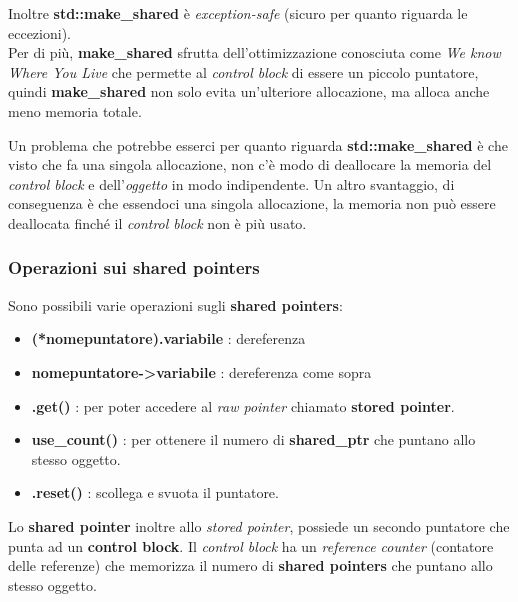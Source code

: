\textsf{\small Inoltre \textbf{std::make\_shared} è \emph{exception-safe} (sicuro per quanto riguarda le eccezioni).} \\

\textsf{\small Per di più, \textbf{make\_shared} sfrutta dell'ottimizzazione conosciuta come \emph{We know Where You Live} che permette al \emph{control block} di essere un piccolo puntatore, quindi \textbf{make\_shared} non solo evita un'ulteriore allocazione, ma alloca anche meno memoria totale.} \break

\textsf{\small Un problema che potrebbe esserci per quanto riguarda \textbf{std::make\_shared} è che visto che fa una singola allocazione, non c'è modo di deallocare la memoria del \emph{control block} e dell'\emph{oggetto} in modo indipendente. Un altro svantaggio, di conseguenza è che essendoci una singola allocazione, la memoria non può essere deallocata finché il \emph{control block} non è più usato. } \\

\subsubsection{Operazioni sui shared pointers}

\textsf{\small Sono possibili varie operazioni sugli \textbf{shared pointers}: } \\

\begin{itemize}
	\item \textsf{\small \textbf{(*nomepuntatore).variabile} : dereferenza}
	\item \textsf{\small \textbf{nomepuntatore->variabile} : dereferenza come sopra}
	\item \textsf{\small \textbf{.get()} : per poter accedere al \emph{raw pointer} chiamato \textbf{stored pointer}.}
	\item \textsf{\small \textbf{use\_count()} : per ottenere il numero di \textbf{shared\_ptr} che puntano allo stesso oggetto.}
	\item \textsf{\small \textbf{.reset()} : scollega e svuota il puntatore.}
\end{itemize}

\textsf{\small Lo \textbf{shared pointer} inoltre allo \emph{stored pointer}, possiede un secondo puntatore che punta ad un \textbf{control block}. Il \emph{control block} ha un \emph{reference counter} (contatore delle referenze) che memorizza il numero di \textbf{shared pointers} che puntano allo stesso oggetto.} \\

